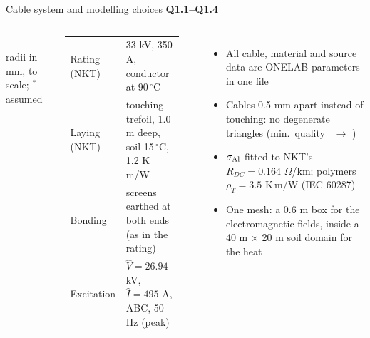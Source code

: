 \documentclass[aspectratio=169,10pt]{beamer}
\newcommand{\q}[1]{{\color{KULMid}\bfseries #1}}
\begin{document}
\begin{frame}{Cable system and modelling choices \q{Q1.1--Q1.4}}
\begin{columns}[T]
\centering
{}\\
{\scriptsize radii in mm, to scale; $^*$ assumed}
\footnotesize
\begin{tabular}{@{}ll@{}}\toprule
Rating (NKT) & 33 kV, 350 A, conductor at 90\,$^\circ$C\\
Laying (NKT) & touching trefoil, 1.0 m deep, soil 15\,$^\circ$C, 1.2 K\,m/W\\
Bonding & screens earthed at both ends (as in the rating)\\
Excitation & $\hat V=26.94$ kV, $\hat I=495$ A, ABC, 50 Hz (peak)\\\bottomrule
\end{tabular}\\[5pt]
\begin{itemize}\footnotesize
\item \alert{All cable, material and source data are ONELAB parameters} in one file
\item Cables 0.5 mm apart instead of touching: no degenerate triangles (min.\ quality \MeshQminTouch\ $\rightarrow$ \MeshQminGap)
\item $\sigma_{\rm Al}$ fitted to NKT's $R_{DC}=0.164$ $\Omega$/km; polymers $\rho_T=3.5$ K\,m/W (IEC 60287)
\item \alert{One mesh}: a 0.6 m box for the electromagnetic fields, inside a 40 m $\times$ 20 m soil domain for the heat
\end{itemize}
\end{columns}

\end{frame}
\end{document}
